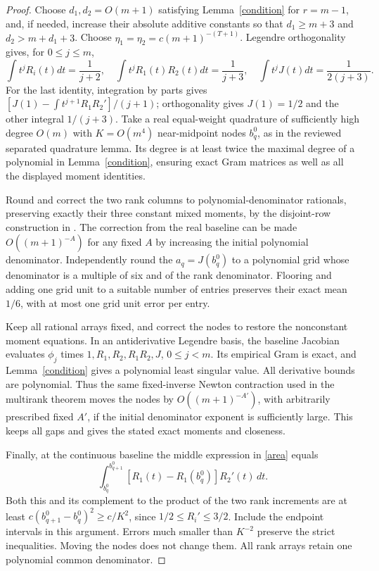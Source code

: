 \documentclass[11pt]{article}
\begin{document}
\begin{proof}
Choose $d_1,d_2=O(m+1)$ satisfying Lemma~\ref{condition} for $r=m-1$,
and, if needed, increase their absolute additive constants so that
$d_1\ge m+3$ and $d_2>m+d_1+3$.
Choose $\eta_1=\eta_2=c(m+1)^{-(T+1)}$.
Legendre orthogonality gives, for $0\le j\le m$,
\[
 \int t^jR_i(t)dt=\frac1{j+2},\quad
 \int t^jR_1(t)R_2(t)dt=\frac1{j+3},\quad
 \int t^jJ(t)dt=\frac1{2(j+3)}.
\]
For the last identity, integration by parts gives
$[J(1)-\int t^{j+1}R_1R_2']/({j+1})$; orthogonality gives
$J(1)=1/2$ and the other integral $1/(j+3)$.
Take a real equal-weight quadrature of sufficiently high degree
$O(m)$ with $K=O(m^4)$ near-midpoint nodes $b_q^0$, as in the reviewed
separated quadrature lemma. Its degree is at least twice the maximal
degree of a polynomial in Lemma~\ref{condition}, ensuring exact Gram
matrices as well as all the displayed moment identities.

Round and correct the two rank columns to polynomial-denominator
rationals, preserving exactly their three constant mixed moments, by
the disjoint-row construction in
.
The correction from the real baseline can be made $O((m+1)^{-A})$
for any fixed $A$ by increasing the initial polynomial denominator.
Independently round the $a_q=J(b_q^0)$ to a polynomial grid whose
denominator is a multiple of six and of the rank denominator.
Flooring and adding one grid unit to a suitable number of entries
preserves their exact mean $1/6$, with at most one grid unit error
per entry.

Keep all rational arrays fixed, and correct the nodes to restore the
nonconstant moment equations. In an antiderivative Legendre basis,
the baseline Jacobian evaluates $\phi_j$ times
$1,R_1,R_2,R_1R_2,J$, $0\le j<m$. Its empirical Gram is exact, and
Lemma~\ref{condition} gives a polynomial least singular value.
All derivative bounds are polynomial. Thus the same fixed-inverse
Newton contraction used in the multirank theorem moves the nodes by
$O((m+1)^{-A'})$, with arbitrarily prescribed fixed $A'$, if the
initial denominator exponent is sufficiently large. This keeps all
gaps and gives the stated exact moments and closeness.

Finally, at the continuous baseline the middle expression in
\eqref{area} equals
\[
 \int_{b_q^0}^{b_{q+1}^0}
       [R_1(t)-R_1(b_q^0)]R_2'(t)\,dt.
\]
Both this and its complement to the product of the two rank increments
are at least $c(b_{q+1}^0-b_q^0)^2\ge c/K^2$, since
$1/2\le R_i'\le3/2$. Include the endpoint intervals in this argument.
Errors much smaller than $K^{-2}$ preserve the strict inequalities.
Moving the nodes does not change them. All rank arrays retain one
polynomial common denominator.
\end{proof}
\end{document}
